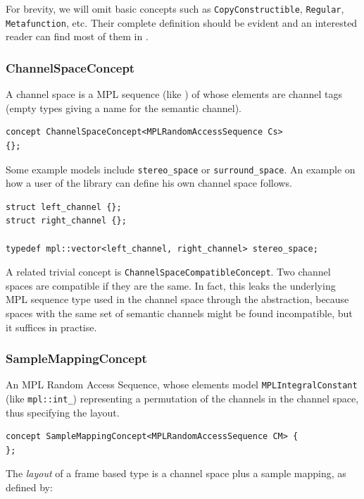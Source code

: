 For brevity, we will omit basic concepts such as
\texttt{Copy\-Constructible}, \texttt{Regular}, \texttt{Metafunction},
etc. Their complete definition should be evident and an interested
reader can find most of them in \cite{stepanov09elements}.

\subsubsection{{ChannelSpaceConcept}}

A channel space is a MPL sequence (like
) of whose elements are channel tags (empty types giving a
name for the semantic channel).

\begin{lstlisting}
concept ChannelSpaceConcept<MPLRandomAccessSequence Cs> 
{};
\end{lstlisting}

Some example models include \texttt{stereo\-\_space} or
\texttt{surround\-\_space}. An example on how a user of the library
can define his own channel space follows.

\begin{lstlisting}
struct left_channel {};
struct right_channel {};

typedef mpl::vector<left_channel, right_channel> stereo_space;
\end{lstlisting}

A related trivial concept is
\texttt{Channel\-Space\-Compatible\-Con\-cept}. Two channel spaces are
compatible if they are the same. In fact, this leaks the underlying
MPL sequence type used in the channel space through the abstraction,
because spaces with the same set of semantic channels might be found
incompatible, but it suffices in practise.

\subsubsection{{SampleMappingConcept}}

An MPL Random Access Sequence, whose elements model
\texttt{MPL\-Integral\-Constant} (like \texttt{mpl::int\_})
representing a permutation of the channels in the channel space, thus
specifying the layout.

\begin{lstlisting}
concept SampleMappingConcept<MPLRandomAccessSequence CM> {
};
\end{lstlisting}

The \emph{layout} of a frame based type is a channel
space plus a sample mapping, as defined by:

